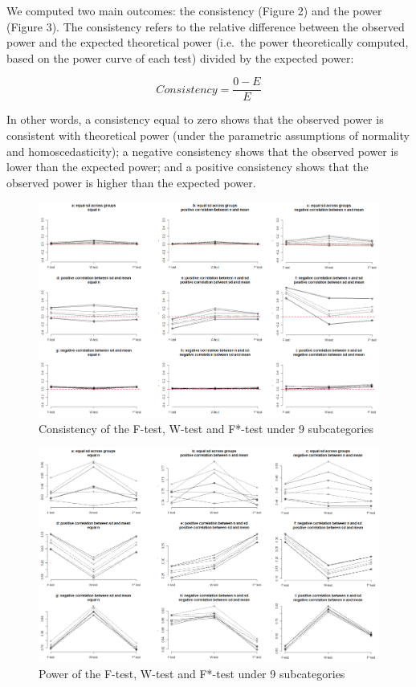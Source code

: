 \documentclass[man,floatsintext]{apa6}
\begin{document}
We computed two main outcomes: the consistency (Figure 2) and the power
(Figure 3). The consistency refers to the relative difference between
the observed power and the expected theoretical power (i.e.~the power
theoretically computed, based on the power curve of each test) divided
by the expected power:

\begin{equation} 
Consistency=\frac{0-E}{E}
\label{eq:RDPWtest}
\end{equation}

In other words, a consistency equal to zero shows that the observed
power is consistent with theoretical power (under the parametric
assumptions of normality and homoscedasticity); a negative consistency
shows that the observed power is lower than the expected power; and a
positive consistency shows that the observed power is higher than the
expected power.

\begin{figure}
\includegraphics[width=1\linewidth]{Rmarkdown folder/Rmarkdown inputs/Fig2_after revision} \caption{Consistency of the F-test, W-test and F*-test under 9 subcategories}\label{fig:unnamed-chunk-2}
\end{figure}

\begin{figure}
\includegraphics[width=1\linewidth]{Rmarkdown folder/Rmarkdown inputs/Fig3_after revision} \caption{Power of the F-test, W-test and F*-test under 9 subcategories}\label{fig:unnamed-chunk-3}
\end{figure}
\end{document}
